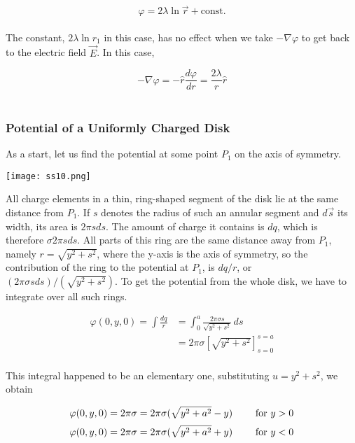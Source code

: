 \documentclass[svgnames]{article}
\begin{document}
\[ \varphi = 2\lambda \ln \vec{r} + \text{const.} \] \\

The constant, $2\lambda \ln r_1$ in this case, has no effect when we take $-\nabla \varphi$ to get back to the electric field $\vec{E}$. In this case, 

\[ -\nabla \varphi = -\hat{r} \frac{d \varphi}{dr} = \frac{2\lambda}{r} \hat{r} \] \\

\subsubsection{Potential of a Uniformly Charged Disk} 

As a start, let us find the potential at some point $P_1$ on the axis of symmetry. 

\begin{center}
\texttt{[image: ss10.png]}
\end{center} 

All charge elements in a thin, ring-shaped segment of the disk lie at the same distance from $P_1$. If $s$ denotes the radius of such an annular segment and $d\vec{s}$ its width, its area is $2\pi s ds$. The amount of charge it contains is $dq$, which is therefore $\sigma 2\pi s ds$. All parts of this ring are the same distance away from $P_1$, namely $r = \sqrt{y^2 + s^2}$, where the y-axis is the axis of symmetry, so the contribution of the ring to the potential at $P_1$, is $dq / r$, or $(2\pi \sigma s ds)/(\sqrt{y^2 + s^2})$. To get the potential from the whole disk, we have to integrate over all such rings. 

\begin{align*} 
\varphi(0, y, 0) = \int \frac{dq}{r} &= \int_0^a \frac{2\pi \sigma s}{\sqrt{y^2 + s^2}}\,ds \\
&= 2\pi \sigma \left[\sqrt{y^2 + s^2 }\right]_{s=0}^{s=a} 
\end{align*} \\

This integral happened to be an elementary one, substituting $u = y^2 + s^2$, we obtain 

\[ \varphi(0, y, 0) = 2\pi\sigma = 2\pi \sigma (\sqrt{y^2 + a^2} - y) \hspace{20px} \text{ for $y > 0$} \]
\[ \varphi(0, y, 0) = 2\pi\sigma = 2\pi \sigma (\sqrt{y^2 + a^2} + y) \hspace{20px} \text{ for $y < 0$} \]\\
\end{document}
